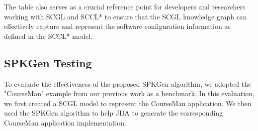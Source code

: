 \documentclass[runningheads]{llncs}
\begin{document}
The table also serves as a crucial reference point for developers and researchers working with SCGL and SCCL* to ensure that the SCGL knowledge graph can effectively capture and represent the software configuration information as defined in the SCCL* model.

\subsection{SPKGen Testing}
To evaluate the effectiveness of the proposed SPKGen algorithm, we adopted the "CourseMan" example from our previous work as a benchmark. In this evaluation, we first created a SCGL model to represent the CourseMan application. We then used the SPKGen algorithm to help JDA to generate the corresponding CourseMan application implementation. 





\end{document}
